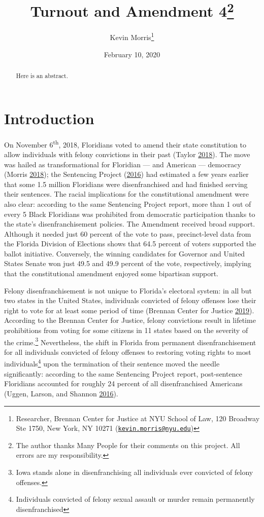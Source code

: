 \documentclass[
  12pt,
]{article}
\title{Turnout and Amendment 4\thanks{The author thanks Many People for their comments on this project. All errors are my responsibility.}}
\author{Kevin Morris\footnote{Researcher, Brennan Center for Justice at NYU School of Law, 120 Broadway Ste 1750, New York, NY 10271 (\href{mailto:kevin.morris@nyu.edu}{\nolinkurl{kevin.morris@nyu.edu}})}}
\date{February 10, 2020}
\begin{document}
\maketitle
\begin{abstract}
Here is an abstract.
\end{abstract}

\pagebreak


\hypertarget{introduction}{%
\section*{Introduction}\label{introduction}}

On November 6\textsuperscript{th}, 2018, Floridians voted to amend their state constitution to allow individuals with felony convictions in their past (Taylor \protect\hyperlink{ref-Taylor2018}{2018}). The move was hailed as transformational for Floridian --- and American --- democracy (Morris \protect\hyperlink{ref-Morris2018}{2018}); the Sentencing Project (\protect\hyperlink{ref-sentencing_2016}{2016}) had estimated a few years earlier that some 1.5 million Floridians were disenfranchised and had finished serving their sentences. The racial implications for the constitutional amendment were also clear: according to the same Sentencing Project report, more than 1 out of every 5 Black Floridians was prohibited from democratic participation thanks to the state's disenfranchisement policies. The Amendment received broad support. Although it needed just 60 percent of the vote to pass, precinct-level data from the Florida Division of Elections shows that 64.5 percent of voters supported the ballot initiative. Conversely, the winning candidates for Governor and United States Senate won just 49.5 and 49.9 percent of the vote, respectively, implying that the constitutional amendment enjoyed some bipartisan support.

Felony disenfranchisement is not unique to Florida's electoral system: in all but two states in the United States, individuals convicted of felony offenses lose their right to vote for at least some period of time (Brennan Center for Justice \protect\hyperlink{ref-bcj_laws}{2019}). According to the Brennan Center for Justice, felony convictions result in lifetime prohibitions from voting for some citizens in 11 states based on the severity of the crime.\footnote{Iowa stands alone in disenfranchising all individuals ever convicted of felony offenses.} Nevertheless, the shift in Florida from permanent disenfranchisement for all individuals convicted of felony offenses to restoring voting rights to most individuals\footnote{Individuals convicted of felony sexual assault or murder remain permanently disenfranchised} upon the termination of their sentence moved the needle significantly: according to the same Sentencing Project report, post-sentence Floridians accounted for roughly 24 percent of all disenfranchised Americans (Uggen, Larson, and Shannon \protect\hyperlink{ref-sentencing_2016}{2016}).
\end{document}
